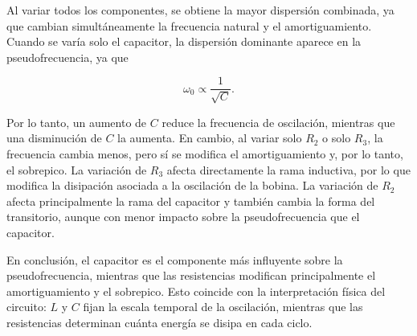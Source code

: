 Al variar todos los componentes, se obtiene la mayor dispersión combinada, ya que cambian simultáneamente la frecuencia natural y el amortiguamiento. Cuando se varía solo el capacitor, la dispersión dominante aparece en la pseudofrecuencia, ya que

\begin{equation}
    \omega_0 \propto \frac{1}{\sqrt{C}}.
\end{equation}

Por lo tanto, un aumento de $C$ reduce la frecuencia de oscilación, mientras que una disminución de $C$ la aumenta. En cambio, al variar solo $R_2$ o solo $R_3$, la frecuencia cambia menos, pero sí se modifica el amortiguamiento y, por lo tanto, el sobrepico. La variación de $R_3$ afecta directamente la rama inductiva, por lo que modifica la disipación asociada a la oscilación de la bobina. La variación de $R_2$ afecta principalmente la rama del capacitor y también cambia la forma del transitorio, aunque con menor impacto sobre la pseudofrecuencia que el capacitor.

En conclusión, el capacitor es el componente más influyente sobre la pseudofrecuencia, mientras que las resistencias modifican principalmente el amortiguamiento y el sobrepico. Esto coincide con la interpretación física del circuito: $L$ y $C$ fijan la escala temporal de la oscilación, mientras que las resistencias determinan cuánta energía se disipa en cada ciclo.

